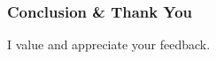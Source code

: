 \documentclass{beamer}
\begin{document}




\begin{frame}
\frametitle{Conclusion \& Thank You}
\begin{block}
    {I value and appreciate your feedback.}
\end{block}
\end{frame}
\end{document}
